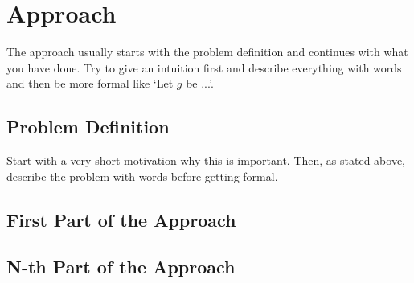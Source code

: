 \chapter{Approach}\label{chap:approach}
The approach usually starts with the problem definition and continues with what you have done. Try to give an intuition first and describe everything with words and then be more formal like `Let $g$ be ...'.

\section{Problem Definition}
Start with a very short motivation why this is important. Then, as stated above, describe the problem with words before getting formal.

\section{First Part of the Approach}

\section{N-th Part of the Approach}
